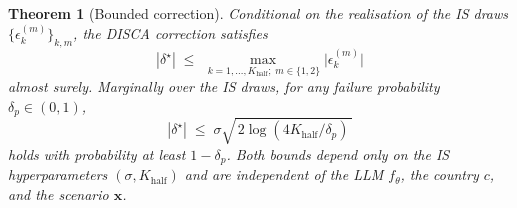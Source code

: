 \documentclass{article}
\newtheorem{theorem}{Theorem}
\begin{document}
\begin{theorem}[Bounded correction]
\label{thm:bounded}
Conditional on the realisation of the IS draws $\{\epsilon_k^{(m)}\}_{k,m}$, the DISCA correction satisfies
\begin{equation}
|\delta^\star| \;\leq\; \max_{\,k=1,\ldots,K_{\text{half}};\;m\in\{1,2\}} \big|\epsilon_k^{(m)}\big|
\label{eq:bounded-as}
\end{equation}
almost surely. Marginally over the IS draws, for any failure probability $\delta_p \in (0,1)$,
\begin{equation}
|\delta^\star| \;\leq\; \sigma\sqrt{\,2\log(4K_{\text{half}}/\delta_p)\,}
\label{eq:bounded-hp}
\end{equation}
holds with probability at least $1 - \delta_p$. Both bounds depend only on the IS hyperparameters $(\sigma, K_{\text{half}})$ and are independent of the LLM $f_\theta$, the country $c$, and the scenario $\mathbf{x}$.
\end{theorem}
\end{document}
